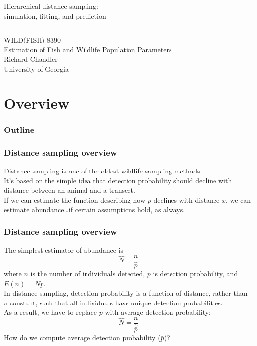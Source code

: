 \documentclass[color=usenames,dvipsnames]{beamer}\usepackage[]{graphicx}\usepackage[]{color}
\begin{document}
\begin{frame}[plain]
  \LARGE
  \centering
  {
    \LARGE Hierarchical distance sampling: \\
    \Large simulation, fitting, and prediction %
  }
  {\color{default} \rule{\textwidth}{0.1pt} }
  \vfill
  \large
  WILD(FISH) 8390 \\
  Estimation of Fish and Wildlife Population Parameters \\
  \vfill
  \large
  Richard Chandler \\
  University of Georgia \\
\end{frame}






\section{Overview}



\begin{frame}[plain]
  \frametitle{Outline}
  \Large
\end{frame}



\begin{frame}
  \frametitle{Distance sampling overview}
  Distance sampling is one of the oldest wildlife sampling methods. \\
  \pause
  \vfill
  It's based on the simple idea that detection probability should
  decline with distance between an animal and a transect. \\
  \pause
  \vfill
  If we can estimate the function describing how $p$ declines with
  distance $x$, we can estimate abundance\dots \pause if certain
  assumptions hold, as always. \\
\end{frame}



\begin{frame}
  \frametitle{Distance sampling overview}
  The simplest estimator of abundance is 
  \[
    \hat{N} = \frac{n}{\hat{p}}
  \]
  where $n$ is the number of individuals detected, $p$ is detection
  probability, and $E(n)=Np$. \\
  \pause
  \vfill
  In distance sampling, detection probability is a \alert{function} of
  distance, rather than a constant, such that all individuals have
  unique detection probabilities. \\
  \pause
  \vfill
  As a result, we have to replace
  $p$ with \alert{average} detection probability:
  \[
    \hat{N} = \frac{n}{\hat{\bar{p}}}
  \]
  \pause
  \vfill
  How do we compute average detection probability ($\bar{p}$)?
\end{frame}
\end{document}
